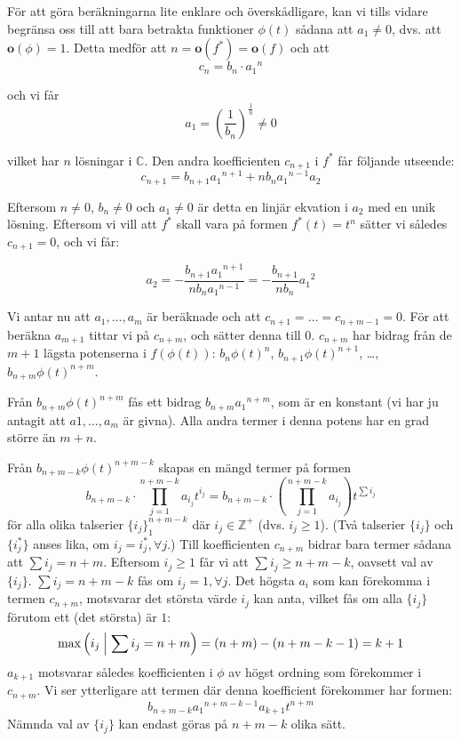 För att göra beräkningarna lite enklare och överskådligare, kan vi tills vidare begränsa oss till att bara betrakta funktioner $\phi(t)$ sådana att $a_1 \neq 0$, dvs. att $\mathbf{o}(\phi)=1$. Detta medför att $n = \mathbf{o}(f^*) = \mathbf{o}(f)$ och att 
\[c_n=b_n \cdot {a_1}^n\]

och vi får
\[a_1 = \left(\frac{1}{b_n}\right)^\frac{1}{n} \neq 0\]

vilket har $n$ lösningar i $\mathbb{C}$. Den andra koefficienten $c_{n+1}$ i $f^*$ får följande utseende:
\[c_{n+1} = b_{n+1} {a_1}^{n+1} + n b_n {a_1}^{n-1} a_2\]

Eftersom $n \neq 0$, $b_n \neq 0$ och $a_1 \neq 0$ är detta en linjär ekvation i $a_2$ med en unik lösning. Eftersom vi vill att $f^*$ skall vara på formen $f^*(t) = t^n$ sätter vi således $c_{n+1} = 0$, och vi får:

\[a_2 = -\frac{b_{n+1} {a_1}^{n+1}}{n b_n {a_1}^{n-1}}=-\frac{b_{n+1}}{n b_n} {a_1}^2\]

Vi antar nu att $a_1, \ldots, a_m$ är beräknade och att $c_{n+1} = \ldots = c_{n+m-1} = 0$. För att beräkna $a_{m+1}$ tittar vi på $c_{n+m}$, och sätter denna till $0$. $c_{n+m}$ har bidrag från de $m + 1$ lägsta potenserna i $f(\phi(t))$: $b_n\phi(t)^n$, $b_{n+1}\phi(t)^{n+1}$, \ldots, $b_{n+m}\phi(t)^{n+m}$.

Från $b_{n+m} \phi(t)^{n+m}$ fås ett bidrag $b_{n+m} {a_1}^{n+m}$, som är en konstant (vi har ju antagit att $a1,\ldots,a_m$ är givna). Alla andra termer i denna potens har en grad större än $m + n$.

Från $b_{n+m-k} \phi(t)^{n+m-k}$ skapas en mängd termer på formen
\[b_{n+m-k} \cdot \prod_{j=1}^{n+m-k} a_{i_j} t^{i_j} = b_{n+m-k} \cdot \left( \prod_{j=1}^{n+m-k} a_{i_j} \right) t^{\sum i_j} \]
för alla olika talserier $\{i_j\}_1^{n+m-k}$ där $i_j \in \mathbb{Z}^+$ (dvs. $i_j \geq 1$). (Två talserier $\{i_j\}$ och $\{i^*_j\}$ anses lika, om $i_j=i^*_j, \forall j$.) Till koefficienten $c_{n+m}$ bidrar bara termer sådana att $\sum i_j = n+m$. Eftersom $i_j \geq 1$ får vi att $\sum i_j \geq n+m-k$, oavsett val av $\{i_j\}$. $\sum i_j = n+m-k$ fås om $i_j = 1, \forall j$. Det högsta $a_i$ som kan förekomma i termen $c_{n+m}$, motsvarar det största värde $i_j$ kan anta, vilket fås om alla $\{i_j\}$ förutom ett (det största) är $1$:
\[\max \left( i_j \Bigm| \sum i_j = n+m \right) = (n+m)-(n+m-k-1)=k+1\] 
$a_{k+1}$ motsvarar således koefficienten i $\phi$ av högst ordning som förekommer i $c_{n+m}$. Vi ser ytterligare att termen där denna koefficient förekommer har formen:
\[b_{n+m-k} {a_1}^{n+m-k-1} a_{k+1} t^{n+m}\]
Nämnda val av $\{i_j\}$ kan endast göras på $n + m - k$ olika sätt.

